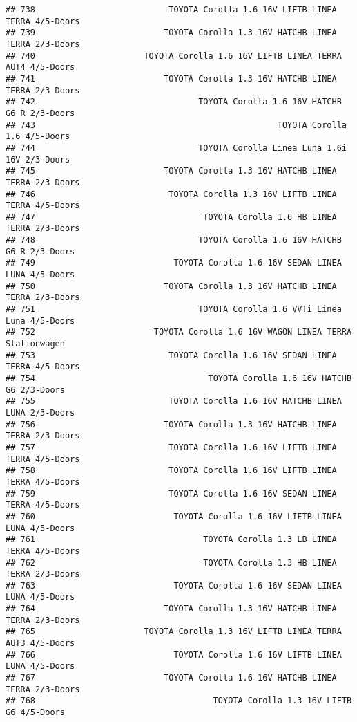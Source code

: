 \documentclass[]{article}
\begin{document}
\begin{verbatim}
## 738                           TOYOTA Corolla 1.6 16V LIFTB LINEA TERRA 4/5-Doors
## 739                          TOYOTA Corolla 1.3 16V HATCHB LINEA TERRA 2/3-Doors
## 740                      TOYOTA Corolla 1.6 16V LIFTB LINEA TERRA AUT4 4/5-Doors
## 741                          TOYOTA Corolla 1.3 16V HATCHB LINEA TERRA 2/3-Doors
## 742                                 TOYOTA Corolla 1.6 16V HATCHB G6 R 2/3-Doors
## 743                                                 TOYOTA Corolla 1.6 4/5-Doors
## 744                                 TOYOTA Corolla Linea Luna 1.6i 16V 2/3-Doors
## 745                          TOYOTA Corolla 1.3 16V HATCHB LINEA TERRA 2/3-Doors
## 746                           TOYOTA Corolla 1.3 16V LIFTB LINEA TERRA 4/5-Doors
## 747                                  TOYOTA Corolla 1.6 HB LINEA TERRA 2/3-Doors
## 748                                 TOYOTA Corolla 1.6 16V HATCHB G6 R 2/3-Doors
## 749                            TOYOTA Corolla 1.6 16V SEDAN LINEA LUNA 4/5-Doors
## 750                          TOYOTA Corolla 1.3 16V HATCHB LINEA TERRA 2/3-Doors
## 751                                 TOYOTA Corolla 1.6 VVTi Linea Luna 4/5-Doors
## 752                        TOYOTA Corolla 1.6 16V WAGON LINEA TERRA Stationwagen
## 753                           TOYOTA Corolla 1.6 16V SEDAN LINEA TERRA 4/5-Doors
## 754                                   TOYOTA Corolla 1.6 16V HATCHB G6 2/3-Doors
## 755                           TOYOTA Corolla 1.6 16V HATCHB LINEA LUNA 2/3-Doors
## 756                          TOYOTA Corolla 1.3 16V HATCHB LINEA TERRA 2/3-Doors
## 757                           TOYOTA Corolla 1.6 16V LIFTB LINEA TERRA 4/5-Doors
## 758                           TOYOTA Corolla 1.6 16V LIFTB LINEA TERRA 4/5-Doors
## 759                           TOYOTA Corolla 1.6 16V SEDAN LINEA TERRA 4/5-Doors
## 760                            TOYOTA Corolla 1.6 16V LIFTB LINEA LUNA 4/5-Doors
## 761                                  TOYOTA Corolla 1.3 LB LINEA TERRA 4/5-Doors
## 762                                  TOYOTA Corolla 1.3 HB LINEA TERRA 2/3-Doors
## 763                            TOYOTA Corolla 1.6 16V SEDAN LINEA LUNA 4/5-Doors
## 764                          TOYOTA Corolla 1.3 16V HATCHB LINEA TERRA 2/3-Doors
## 765                      TOYOTA Corolla 1.3 16V LIFTB LINEA TERRA AUT3 4/5-Doors
## 766                            TOYOTA Corolla 1.6 16V LIFTB LINEA LUNA 4/5-Doors
## 767                          TOYOTA Corolla 1.6 16V HATCHB LINEA TERRA 2/3-Doors
## 768                                    TOYOTA Corolla 1.3 16V LIFTB G6 4/5-Doors

\end{verbatim}
\end{document}
